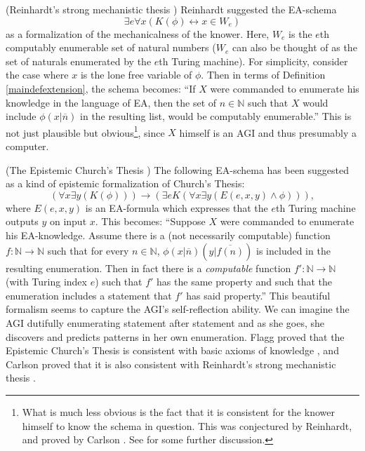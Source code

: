 \documentclass[runningheads]{llncs}
\begin{document}
\begin{example}
    (Reinhardt's strong mechanistic thesis
    \cite{reinhardt1985absolute} \cite{reinhardt1986epistemic}
    \cite{carlson}) Reinhardt suggested the
    EA-schema
    \[\exists e \forall x ( K(\phi) \leftrightarrow x\in W_e)\]
    as a formalization of the mechanicalness of the knower. Here, $W_e$
    is the $e$th computably enumerable set of natural numbers ($W_e$ can also
    be thought of as the set of naturals enumerated by the $e$th Turing machine).
    For simplicity, consider the case where $x$ is the lone free variable
    of $\phi$. Then in terms of Definition \ref{maindefextension}, the schema
    becomes:
    ``If $X$ were commanded to enumerate his knowledge in the language of EA,
    then the set of $n\in\mathbb N$ such that $X$ would include $\phi(x|\overline n)$
    in the resulting list, would be computably enumerable.''
    This is not just plausible but obvious\footnote{What is much less obvious
    is the fact that it is consistent for the knower himself to
    know the schema in question. This was conjectured by Reinhardt, and
    proved by Carlson \cite{carlson}. See \cite{aldini2015theory} for some further
    discussion.}, since $X$ himself
    is an AGI and thus presumably a computer.
\end{example}

\begin{example}
  (The Epistemic Church's Thesis \cite{flagg1985church} \cite{carlson2016collapsing})
  The following EA-schema has been suggested as a kind of epistemic formalization
  of Church's Thesis:
  \[
  ( \forall x\exists y (K(\phi))  ) \rightarrow
  ( \exists e K( \forall x\exists y ( E(e,x,y) \wedge \phi  )  )  ),
  \]
  where $E(e,x,y)$ is an EA-formula which expresses that the $e$th Turing machine
  outputs $y$ on input $x$.
  This becomes: ``Suppose $X$ were commanded to enumerate his EA-knowledge.
  Assume there is a (not necessarily computable) function
  $f:\mathbb N\to\mathbb N$ such that for every $n\in\mathbb N$,
  $\phi(x|\overline n)(y|\overline{f(n)})$ is included in the resulting enumeration.
  Then in fact there is a \emph{computable}
  function $f':\mathbb N\to\mathbb N$ (with Turing index $e$)
  such that $f'$ has the same property and such that the enumeration includes
  a statement that $f'$ has said property.''
  This beautiful formalism seems to capture the AGI's self-reflection ability.
  We can imagine the AGI dutifully enumerating statement after statement and
  as she goes, she discovers and predicts patterns in her own enumeration.
  Flagg proved that the Epistemic Church's Thesis is
  consistent with basic axioms of knowledge \cite{flagg1985church},
  and Carlson proved that it is also consistent with
  Reinhardt's strong mechanistic thesis \cite{carlson2016collapsing}.
\end{example}
\end{document}
